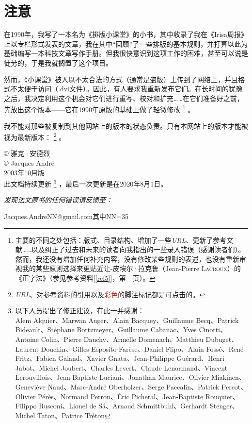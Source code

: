 \chapter*{注意}

在1990年，我写了一本名为《排版小课堂》的小书，其中收录了我在《Irisa周报》上以专栏形式发表的文章，我在其中“回顾”了一些排版的基本规则，并打算以此为基础编写一本科技文章写作手册。但我很快意识到这项工作的困难，甚至可以说是徒劳的，于是我就搁置了这个项目。

然而，《小课堂》被人以不太合法的方式（通常是盗版）上传到了网络上，并且格式不太便于访问（.dvi文件）。因此，有人要求我重新发布它们。在长时间的犹豫之后，我决定利用这个机会对它们进行重写、校对和扩充……在它们准备好之前，先放出这个版本——它在1990年原版的基础上做了轻微修改
    \footnote{主要的不同之处包括：版式、目录结构、增加了一些\emph{URL}、更新了参考文献……以及纠正了过去和未来的读者向我指出的一些录入错误（感谢读者们）。然而，我还没有增加任何补充内容，没有修改某些规则的表述，也没有重新审视我的某些原则选择来更贴近让-皮埃尔·拉克鲁（Jean-Pierre \textsc{Lacroux}）的《正字法》（参见参考资料[\ref{ref5}]，第~\pageref{ref5}~页）。%
    }
。

我不能对那些被复制到其他网站上的版本的状态负责。只有本网站上的版本才能被视为最新版本：
    \footnote{\emph{URL}、对参考资料的引用以及\textcolor{brown}{彩色}的脚注标记都是可点击的。}
。\label{aver}

\begin{flushright}
© 雅克·安德烈\\
© Jacques André\\
2003年10月版\\
此文档持续更新
    \footnote{以下人员提出了修正建议，在此一并感谢：\\
    Alem Alquier、Marwan Auger、Alain Bacquey、Guillaume Becq、Patrick Bideault、Stéphane Bortzmeyer、Guillaume Cabanac、Yves Cinotti、Antoine Colin、Pierre Dauchy、Armelle Domenach、Matthieu Dubuget、Laurent Douchin、Gilles Esposito-Farèse、Daniel Flipo、Alain Fossé、René Fritz、Fabien Galand、Xavier Gnata、Jean-Philippe Guérard、Henri Jabot、Michel Joubert、Charles Levert、Claude Lenormand、Vincent Lerouvillois、Jean-Baptiste Luciani、Jonathan Maurice、Olivier Miakinen、Geneviève Naud、Marc-André Oberholzer、Serge Paccalin、Patrick Percot、Olivier Pérès、Normand Perron、Éric Picheral、Jean-Baptiste Rouquier、Filippo Rusconi、Lionel de Sá、Arnaud Schmittbuhl、Gerhardt Stenger、Michel Taton、Patrice Tréton
    }
，最后一次更新是在2020年8月1日。
\end{flushright}

\vfill
\begin{center}
    \emph{发现法文原书的任何错误请反馈至：
    }

    Jacques.AndreNN@gmail.com\qquad 其中NN=35
\end{center}

